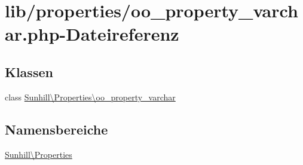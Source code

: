\hypertarget{oo__property__varchar_8php}{}\section{lib/properties/oo\+\_\+property\+\_\+varchar.php-\/\+Dateireferenz}
\label{oo__property__varchar_8php}
\subsection*{Klassen}
\begin{DoxyCompactItemize}
\item 
class \hyperlink{classSunhill_1_1Properties_1_1oo__property__varchar}{Sunhill\textbackslash{}\+Properties\textbackslash{}oo\+\_\+property\+\_\+varchar}
\end{DoxyCompactItemize}
\subsection*{Namensbereiche}
\begin{DoxyCompactItemize}
\item 
 \hyperlink{namespaceSunhill_1_1Properties}{Sunhill\textbackslash{}\+Properties}
\end{DoxyCompactItemize}

